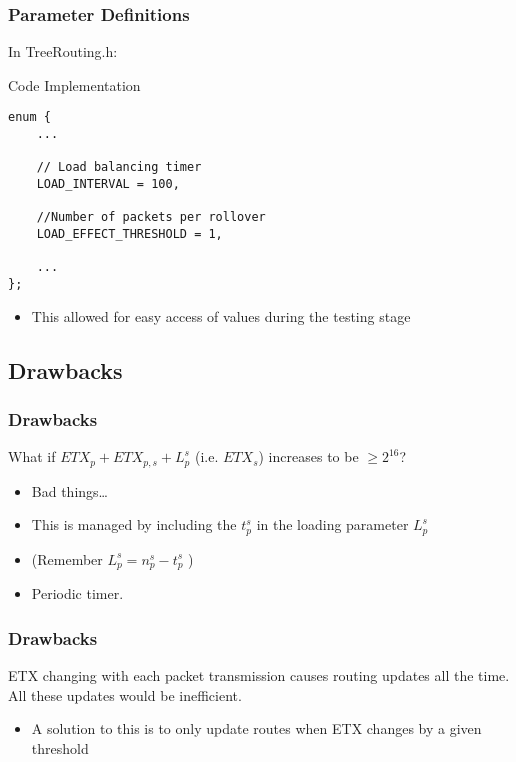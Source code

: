 \documentclass{beamer}
\begin{document}
\begin{frame}[fragile]
  \frametitle{Parameter Definitions}
  In TreeRouting.h:
  \footnotesize{
    \begin{block}{Code Implementation}
      \begin{verbatim}
enum {
    ...

    // Load balancing timer
    LOAD_INTERVAL = 100,        

    //Number of packets per rollover
    LOAD_EFFECT_THRESHOLD = 1, 

    ...
}; 
      \end{verbatim}
    \end{block}

    \begin{itemize}
      \item This allowed for easy access of values during the testing stage
    \end{itemize}
  }
\end{frame}

\subsection{Drawbacks}

\begin{frame}[fragile]
  \frametitle{Drawbacks}
    What if $ETX_p + ETX_{p,s} + L_p^s$ (i.e. $ETX_s$) increases to be $\geq 2^{16}$?
  \begin{itemize}
    \item Bad things\ldots
    \item This is managed by including the $t_p^s$ in the loading parameter
    $L_p^s$
    \item (Remember $L_p^s = n_p^s - t_p^s$ )
    \item Periodic timer.
  \end{itemize}

\end{frame}  



\begin{frame}
  \frametitle{Drawbacks}
    ETX changing with each packet transmission causes routing updates all the
    time. All these updates would be inefficient.
  \begin{itemize}
    \item A solution to this is to only update routes when ETX changes by a given
    threshold
    \end{itemize}
\end{frame}  
\end{document}
